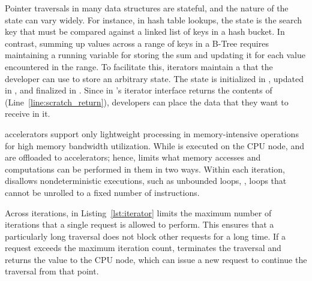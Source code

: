  Pointer traversals in many data structures are stateful, and the nature of the state can vary widely. For instance, in hash table lookups, the state is the search key that must be compared against a linked list of keys in a hash bucket. In contrast, summing up values across a range of keys in a B-Tree requires maintaining a running variable for storing the sum and updating it for each value encountered in the range. To facilitate this, \pulse iterators maintain a  that the developer can use to store an arbitrary state. The state is initialized in , updated in , and finalized in . Since  in \pulse's iterator interface returns the contents of  (Line~\ref{line:scratch_return}), developers can place the data that they want to receive in it.


 \pulse accelerators support only lightweight processing in memory-intensive operations for high memory bandwidth utilization. While  is executed on the CPU node,  and  are offloaded to \pulse accelerators; hence, \pulse limits what memory accesses and computations can be performed in them in two ways. Within each iteration, \pulse disallows nondeterministic executions, such as unbounded loops, \ie, loops that cannot be unrolled to a fixed number of instructions. 

Across iterations,  in Listing~\ref{lst:iterator} limits the maximum number of iterations that a single request is allowed to perform. This ensures that a particularly long traversal does not block other requests for a long time.  
If a request exceeds the maximum iteration count, \pulse terminates the traversal and returns the  value to the CPU node, which can issue a new request to continue the traversal from that point. 

